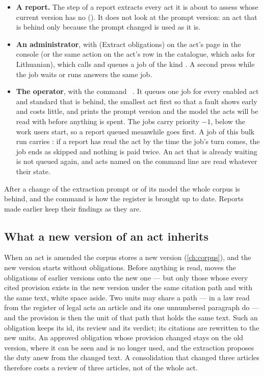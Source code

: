 \begin{itemize}
  \item \textbf{A report.} The step  of a report extracts every act it is
    about to assess whose current version has no 
    (). It does not look at the prompt version: an act that is behind
    only because the prompt changed is used as it is.
  \item \textbf{An administrator}, with  (Extract obligations) on the
    act's page in the console (or the same action on the act's row in the catalogue, which
    asks for Lithuanian), which calls
     and queues a job of the kind
    . A second press while the job waits or runs answers the
    same job.
  \item \textbf{The operator}, with the command ~. It
    queues one job for every enabled act and standard that is behind, the smallest act first
    so that a fault shows early and costs little, and prints the prompt version and the model
    the acts will be read with before anything is spent. The jobs carry priority $-1$, below
    the work users start, so a report queued meanwhile goes first. A job of this bulk run
    carries : if a report has read the act by the time the job's turn
    comes, the job ends as skipped and nothing is paid twice. An act that is already waiting
    is not queued again, and acts named on the command line are read whatever their state.
\end{itemize}

After a change of the extraction prompt or of its model the whole corpus is behind, and the
command is how the register is brought up to date. Reports made earlier keep their findings
as they are.

\subsection{What a new version of an act inherits}\label{sec:obligations:carry}

When an act is amended the corpus stores a new version (\cref{ch:corpus}), and the new
version starts without obligations. Before anything is read,  moves the
 obligations of earlier versions onto the new one --- but only those whose
every cited provision exists in the new version under the same citation path and with the
same text, white space aside. Two units may share a path --- in a law read from the register of legal
acts an article and its one unnumbered paragraph do --- and the provision is then the unit of that
path that holds the same text. Such an obligation keeps its id, its review and its verdict; its
citations are rewritten to the new units. An approved obligation whose provision changed
stays on the old version, where it can be seen and is no longer used, and the extraction
proposes the duty anew from the changed text. A consolidation that changed three articles
therefore costs a review of three articles, not of the whole act.

